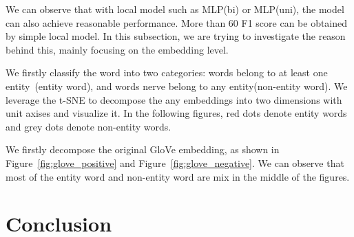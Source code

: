 \documentclass{article}
\begin{document}
We can observe that with local model such as MLP(bi) or MLP(uni), the model can also achieve reasonable performance. More than 60 F1 score can be obtained by simple local model. In this subsection, we are trying to investigate the reason behind this, mainly focusing on the embedding level. 

We firstly classify the word into two categories: words belong to at least one entity~(entity word), and words nerve belong to any entity(non-entity word). We leverage the t-SNE to decompose the any embeddings into two dimensions with unit axises and visualize it. In the following figures, red dots denote entity words and grey dots denote non-entity words. 

We firstly decompose the original GloVe embedding, as shown in Figure~\ref{fig:glove_positive} and Figure~\ref{fig:glove_negative}. We can observe that most of the entity word and non-entity word are mix in the middle of the figures. 












 
\section{Conclusion}


\nocite{*}




\end{document}
